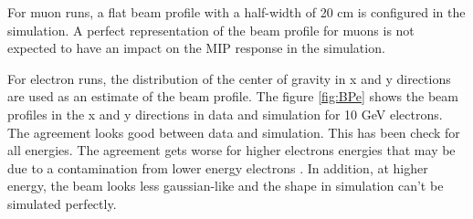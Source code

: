For muon runs, a flat beam profile with a half-width of 20 cm is configured in the simulation. A perfect representation of the beam profile for muons is not expected to have an impact on the MIP response in the simulation.

For electron runs, the distribution of the center of gravity in x and y directions are used as an estimate of the beam profile. The figure \ref{fig:BPe} shows the beam profiles in the x and y directions in data and simulation for 10 GeV electrons. The agreement looks good between data and simulation. This has been check for all energies. The agreement gets worse for higher electrons energies that may be due to a contamination from lower energy electrons \cite{AmbraEnergy}. In addition, at higher energy, the beam looks less gaussian-like and the shape in simulation can't be simulated perfectly.

